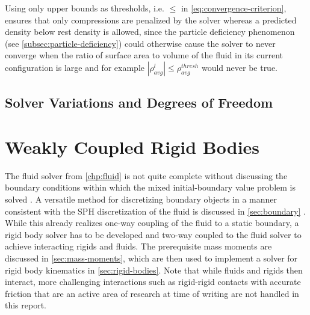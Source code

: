 \documentclass[oneside, a4paper]{book}
\newcommand\abs[1]{\left|#1\right|}
\begin{document}
  Using only upper bounds as thresholds, i.e. $\leq$ in \autoref{eq:convergence-criterion}, ensures that only compressions are penalized by the solver whereas a predicted density below rest density is allowed, since the particle deficiency phenomenon (see \autoref{subsec:particle-deficiency}) could otherwise cause the solver to never converge when the ratio of surface area to volume of the fluid in its current configuration is large and for example $\abs{\rho^l_{avg}} \leq \rho^{thresh}_{avg}$ would never be true. 



    \section{Solver Variations and Degrees of Freedom}\label{sec:alternative-source-terms}


\chapter{Weakly Coupled Rigid Bodies}\label{chp:rigid}
    The fluid solver from \autoref{chp:fluid} is not quite complete without discussing the boundary conditions within which the mixed initial-boundary value problem is solved \autocite{tutorial2019}. A versatile method for discretizing boundary objects in a manner consistent with the SPH discretization of the fluid is discussed in \autoref{sec:boundary} \autocite{versatile-boundary-akinci}. While this already realizes one-way coupling of the fluid to a static boundary, a rigid body solver has to be developed and two-way coupled to the fluid solver to achieve interacting rigids and fluids. The prerequisite mass moments are discussed in \autoref{sec:mass-moments}, which are then used to implement a solver for rigid body kinematics in \autoref{sec:rigid-bodies}. Note that while fluids and rigids then interact, more challenging interactions such as rigid-rigid contacts with accurate friction that are an active area of research at time of writing \autocite{monolithic-rigids-timo} are not handled in this report.
\end{document}
